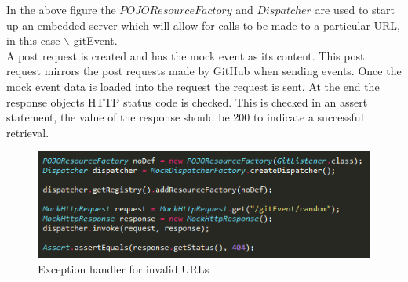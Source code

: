 \documentclass[11pt,a4paper]{article}
\begin{document}
In the above figure the $POJOResourceFactory$ and $Dispatcher$ are used to start up an embedded server which will allow for calls to be made to a particular URL, in this case $\backslash$ gitEvent. \\

A post request is created and has the mock event as its content. This post request mirrors the post requests made by GitHub when sending events. Once the mock event data is loaded into the request the request is sent. At the end the response objects HTTP status code is checked. This is checked in an assert statement, the value of the response should be 200 to indicate a successful retrieval. \\

\begin{figure}[H]
	\begin{center}
		\includegraphics[scale=1.0]{../Images/sample2.png}
		\caption{Exception handler for invalid URLs}
	\end{center}
\end{figure}
\end{document}
